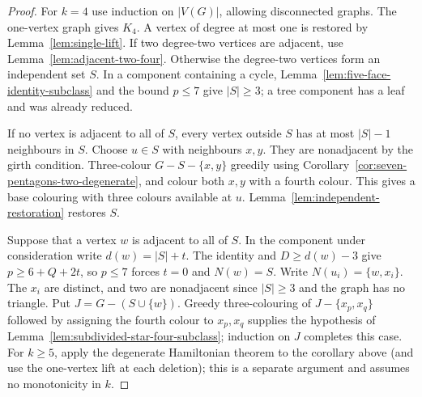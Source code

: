 \documentclass[11pt]{article}
\theoremstyle{remark}
\numberwithin{equation}{section}
\numberwithin{table}{section}
\begin{document}
\begin{proof}
For $k=4$ use induction on $|V(G)|$, allowing disconnected graphs.  The
one-vertex graph gives $K_4$.  A vertex of degree at most one is restored by
Lemma~\ref{lem:single-lift}.  If two degree-two vertices are adjacent, use
Lemma~\ref{lem:adjacent-two-four}.  Otherwise the degree-two
vertices form an independent set $S$.  In a component containing a cycle,
Lemma~\ref{lem:five-face-identity-subclass} and the bound $p\le7$ give
$|S|\ge3$; a tree component has a leaf and was already reduced.

If no vertex is adjacent to all of $S$, every vertex outside $S$ has at most
$|S|-1$ neighbours in $S$.  Choose $u\in S$ with neighbours $x,y$.  They are
nonadjacent by the girth condition.  Three-colour $G-S-\{x,y\}$ greedily
using Corollary~\ref{cor:seven-pentagons-two-degenerate}, and colour both
$x,y$ with a fourth colour.  This gives a base colouring with three colours
available at $u$.  Lemma~\ref{lem:independent-restoration} restores $S$.

Suppose that a vertex $w$ is adjacent to all of $S$.  In the component under
consideration write $d(w)=|S|+t$.  The identity and
$D\ge d(w)-3$ give $p\ge6+Q+2t$, so $p\le7$ forces $t=0$ and
$N(w)=S$.  Write $N(u_i)=\{w,x_i\}$.  The $x_i$ are distinct, and two are
nonadjacent since $|S|\ge3$ and the graph has no triangle.  Put
$J=G-(S\cup\{w\})$.  Greedy three-colouring of $J-\{x_p,x_q\}$ followed by
assigning the fourth colour to $x_p,x_q$ supplies the hypothesis of
Lemma~\ref{lem:subdivided-star-four-subclass}; induction on $J$ completes
this case.  For $k\ge5$, apply the degenerate Hamiltonian theorem to the
corollary above (and use the one-vertex lift at each deletion); this is a
separate argument and assumes no monotonicity in $k$.
\end{proof}
\end{document}
